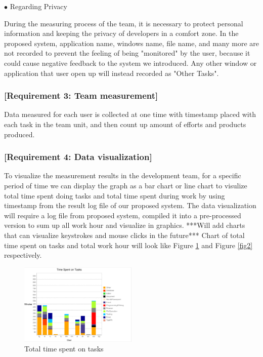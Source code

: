 \documentclass [paper]{ieice}
\begin{document}
\noindent $\bullet$ Regarding Privacy \par
		During the measuring process of the team, it is necessary to protect personal information and keeping the privacy of developers in a comfort zone. In the proposed system, application name, windows name, file name, and many more are not recorded to prevent the feeling of being "monitored" by the user, because it could cause negative feedback to the system we introduced. Any other window or application that user open up will instead recorded as "Other Tasks".
		
\subsubsection{[Requirement 3: Team measurement]}
	Data measured for each user is collected at one time with timestamp placed with each task in the team unit, and then count up amount of efforts and products produced.
	
\subsubsection{[Requirement 4: Data visualization]}
	To visualize the measurement results in the development team, for a specific period of time we can display the graph as a bar chart or line chart to visulize total time spent doing tasks and total time spent during work by using timestamp from the result log file of our proposed system. The data visualization will require a log file from proposed system, compiled it into a pre-processed version to sum up all work hour and visualize in graphics. ***Will add charts that can visualize keystrokes and mouse clicks in the future*** Chart of total time spent on tasks and total work hour will look like Figure \ref{fig1} and Figure \ref{fig2} respectively.
	
\begin{figure}[h]
	\centering	
\includegraphics[width=0.5\textwidth]{fig1}
	\caption{Total time spent on tasks}
	\label{fig1}
\end{figure}
\end{document}
